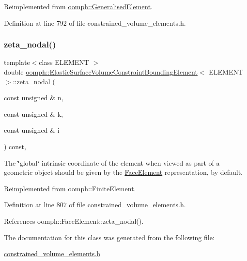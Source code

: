 Reimplemented from \hyperlink{classoomph_1_1GeneralisedElement_a6ae09fc0d68e4309ac1b03583d252845}{oomph\+::\+Generalised\+Element}.



Definition at line 792 of file constrained\+\_\+volume\+\_\+elements.\+h.

\mbox{\label{classoomph_1_1ElasticSurfaceVolumeConstraintBoundingElement_ab9826b68e1931ed4eafdf20af0bf070d}} 
\subsubsection{\texorpdfstring{zeta\+\_\+nodal()}{zeta\_nodal()}}
{\footnotesize\ttfamily template$<$class E\+L\+E\+M\+E\+NT $>$ \\
double \hyperlink{classoomph_1_1ElasticSurfaceVolumeConstraintBoundingElement}{oomph\+::\+Elastic\+Surface\+Volume\+Constraint\+Bounding\+Element}$<$ E\+L\+E\+M\+E\+NT $>$\+::zeta\+\_\+nodal (\begin{DoxyParamCaption}\item[{const unsigned \&}]{n,  }\item[{const unsigned \&}]{k,  }\item[{const unsigned \&}]{i }\end{DoxyParamCaption}) const\hspace{0.3cm}{\ttfamily [inline]}, {\ttfamily [virtual]}}



The \char`\"{}global\char`\"{} intrinsic coordinate of the element when viewed as part of a geometric object should be given by the \hyperlink{classoomph_1_1FaceElement}{Face\+Element} representation, by default. 



Reimplemented from \hyperlink{classoomph_1_1FiniteElement_a849561c5fbcbc07dc49d2dc6cca68559}{oomph\+::\+Finite\+Element}.



Definition at line 807 of file constrained\+\_\+volume\+\_\+elements.\+h.



References oomph\+::\+Face\+Element\+::zeta\+\_\+nodal().



The documentation for this class was generated from the following file\+:\begin{DoxyCompactItemize}
\item 
\hyperlink{constrained__volume__elements_8h}{constrained\+\_\+volume\+\_\+elements.\+h}\end{DoxyCompactItemize}
